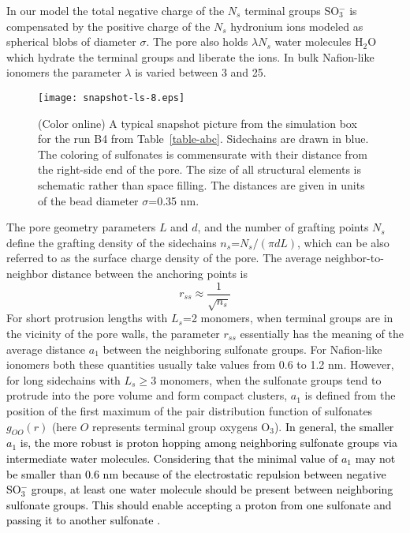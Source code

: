 \documentclass[3p,english,preprint]{elsarticle}
\newcommand{\need}[1]{\textcolor{black}{#1}}
\newcommand{\mage}[1]{\textcolor{black}{#1}}
\begin{document}
In our model the total negative charge of the $N_s$ terminal groups SO$_3^-$ 
is compensated by the  positive charge of the $N_s$ hydronium ions  modeled as spherical blobs of diameter $\sigma$.
The pore also holds $\lambda N_s$ water molecules H$_2$O which hydrate the terminal groups and liberate the ions. 
In bulk Nafion-like ionomers the parameter $\lambda$  is varied between 3 and 25. 


\begin{figure}  [!ht]
\begin{center}
\texttt{[image: snapshot-ls-8.eps]}
\end{center}
\caption{(Color online) 
 A typical snapshot picture from the simulation box for the 
 run B4 from Table~\ref{table-abc}. 
Sidechains are drawn in blue. The coloring of  sulfonates  
is commensurate with their distance from the right-side end of the pore. 
 The size of all structural elements is schematic rather than space filling. The distances are
  given in units of the bead diameter $\sigma$=0.35 nm.   
 \label{fig-3-new}}
\end{figure}

The pore geometry parameters $L$ and $d$, and the number of grafting points $N_s$ 
define the grafting density of the sidechains $n_s$=$N_s/(\pi d L)$,
 which can be also referred to as the surface charge density of the pore. 
The average neighbor-to-neighbor distance between 
the anchoring points is
\begin{equation}
r_{ss} \approx \frac{1}{\sqrt{n_s}}
\label{r-anchor}
\end{equation}
For short protrusion lengths with $L_s$=2 monomers, 
when terminal groups are in the vicinity  of the pore walls, 
the parameter $r_{ss}$ essentially has the meaning of the  average distance $a_1$ 
between the neighboring sulfonate groups. For Nafion-like ionomers
both these quantities usually take values  from %
0.6 to 1.2 nm. 
However, for long sidechains with 
$L_s$$\ge$3 monomers, when the sulfonate groups tend to protrude  into the  pore volume 
and form compact clusters, $a_1$ is defined from the position of 
the first maximum of the pair distribution function of 
sulfonates $g_{OO}(r)$ (here $O$ represents terminal group oxygens O$_3$). 
{\need{
In general, the smaller $a_1$ is, the more robust is  
proton  hopping among neighboring sulfonate groups via intermediate water molecules. 
Considering that the minimal value of $a_1$ may not be smaller than 0.6 nm because of the electrostatic repulsion 
between negative SO$_3^{-}$ groups,  at least one water molecule should be present between neighboring sulfonate
groups. This should enable accepting a proton from one sulfonate and passing it to another sulfonate
 \cite{tsampas-2006,perrin-2007,choi2005,eikerling-2001,marx-2006,spohr-2002}. 
}}
\end{document}
